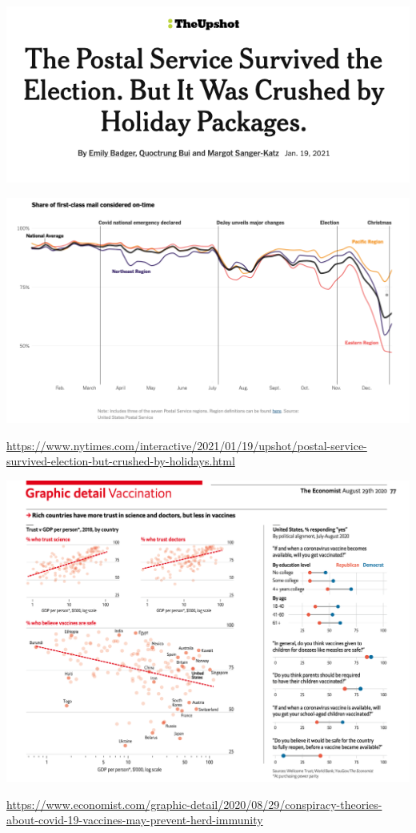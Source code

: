 \documentclass[table]{beamer}\usepackage[]{graphicx}\usepackage[]{color}
\begin{document}
\begin{frame}

\centering

\includegraphics[width=.6\textwidth]{figure-static/upshot-postal-banner.png}

\includegraphics[width=.9\textwidth]{figure-static/upshot-postal-timeseries.png}

\tiny \url{https://www.nytimes.com/interactive/2021/01/19/upshot/postal-service-survived-election-but-crushed-by-holidays.html}

\end{frame}



\begin{frame}

\centering

\includegraphics[width=\textwidth]{figure-static/graphic-detail-vaccination.png}

\tiny \url{https://www.economist.com/graphic-detail/2020/08/29/conspiracy-theories-about-covid-19-vaccines-may-prevent-herd-immunity}

\end{frame}
\end{document}
